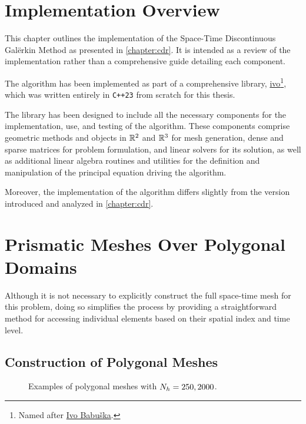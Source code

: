 \section{Implementation Overview}

This chapter outlines the implementation of the Space-Time Discontinuous Galërkin Method as presented in \cref{chapter:cdr}. It is intended as a review of the implementation rather than a comprehensive guide detailing each component.

The algorithm has been implemented as part of a comprehensive library, \href{https://github.com/diantonioandrea/ivo}{ivo}\footnote{Named after \href{https://en.wikipedia.org/wiki/Ivo_Babuška}{Ivo Babuška}.}, which was written entirely in \lstinline{C++23} from scratch for this thesis.

The library has been designed to include all the necessary components for the implementation, use, and testing of the algorithm. These components comprise geometric methods and objects in $\mathbb{R}^{2}$ and $\mathbb{R}^{3}$ for mesh generation, dense and sparse matrices for problem formulation, and linear solvers for its solution, as well as additional linear algebra routines and utilities for the definition and manipulation of the principal equation driving the algorithm.

Moreover, the implementation of the algorithm differs slightly from the version introduced and analyzed in \cref{chapter:cdr}.

\newpage
\section{Prismatic Meshes Over Polygonal Domains} \label{section:mesh}

Although it is not necessary to explicitly construct the full space-time mesh for this problem, doing so simplifies the process by providing a straightforward method for accessing individual elements based on their spatial index and time level. 

\subsection{Construction of Polygonal Meshes} \label{subsection:pol_mesh}

\begin{figure}[!ht]
    \begin{subfigure}[b]{0.49\textwidth}
		\centering
        
    \end{subfigure}
	\hfill
    \begin{subfigure}[b]{0.49\textwidth}
		\centering
        
    \end{subfigure}
    \caption{Examples of polygonal meshes with $N_h = 250, 2000$.}
\end{figure}

